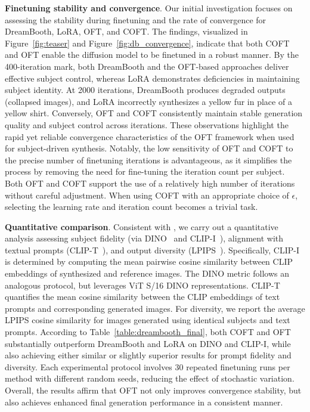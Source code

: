 \textbf{Finetuning stability and convergence}. Our initial investigation focuses on assessing the stability during finetuning and the rate of convergence for DreamBooth, LoRA, OFT, and COFT. The findings, visualized in Figure~\ref{fig:teaser} and Figure~\ref{fig:db_convergence}, indicate that both COFT and OFT enable the diffusion model to be finetuned in a robust manner. By the 400-iteration mark, both DreamBooth and the OFT-based approaches deliver effective subject control, whereas LoRA demonstrates deficiencies in maintaining subject identity. At 2000 iterations, DreamBooth produces degraded outputs (collapsed images), and LoRA incorrectly synthesizes a yellow fur in place of a yellow shirt. Conversely, OFT and COFT consistently maintain stable generation quality and subject control across iterations. These observations highlight the rapid yet reliable convergence characteristics of the OFT framework when used for subject-driven synthesis. Notably, the low sensitivity of OFT and COFT to the precise number of finetuning iterations is advantageous, as it simplifies the process by removing the need for fine-tuning the iteration count per subject. Both OFT and COFT support the use of a relatively high number of iterations without careful adjustment. When using COFT with an appropriate choice of $\epsilon$, selecting the learning rate and iteration count becomes a trivial task.

\textbf{Quantitative comparison}. Consistent with \cite{ruiz2023dreambooth}, we carry out a quantitative analysis assessing subject fidelity (via DINO~\cite{caron2021emerging} and CLIP-I~\cite{radford2021learning}), alignment with textual prompts (CLIP-T~\cite{radford2021learning}), and output diversity (LPIPS~\cite{zhang2018unreasonable}). Specifically, CLIP-I is determined by computing the mean pairwise cosine similarity between CLIP embeddings of synthesized and reference images. The DINO metric follows an analogous protocol, but leverages ViT S/16 DINO representations. CLIP-T quantifies the mean cosine similarity between the CLIP embeddings of text prompts and corresponding generated images. For diversity, we report the average LPIPS cosine similarity for images generated using identical subjects and text prompts. According to Table~\ref{table:dreambooth_final}, both COFT and OFT substantially outperform DreamBooth and LoRA on DINO and CLIP-I, while also achieving either similar or slightly superior results for prompt fidelity and diversity. Each experimental protocol involves 30 repeated finetuning runs per method with different random seeds, reducing the effect of stochastic variation. Overall, the results affirm that OFT not only improves convergence stability, but also achieves enhanced final generation performance in a consistent manner.

